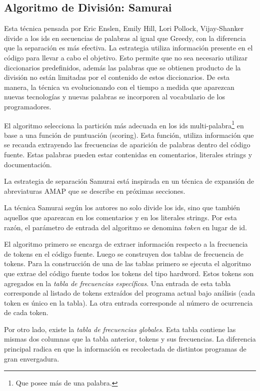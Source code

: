\documentclass[a4paper,12pt]{report}
\begin{document}
\subsection{Algoritmo de División: Samurai}
\label{sec:algSamu}

Esta técnica pensada por Eric Enslen, Emily Hill, Lori Pollock, Vijay-Shanker \cite{EHPV09} divide a los ids en secuencias de palabras al igual que Greedy, con la diferencia que la separación es más efectiva. La estrategia utiliza información presente en el código para llevar a cabo el objetivo. Esto permite que no sea necesario utilizar diccionarios predefinidos, además las palabras que se obtienen producto de la división no están limitadas por el contenido de estos diccionarios. De esta manera, la técnica va evolucionando con el tiempo a medida que aparezcan nuevas tecnologías y nuevas palabras se incorporen al vocabulario de los programadores.

El algoritmo selecciona la partición más adecuada en los ids multi-palabra\footnote[1]{Que posee más de una palabra.} en base a una función de puntuación (scoring). Esta función, utiliza información que se recauda extrayendo las frecuencias de aparición de palabras dentro del código fuente. Estas palabras pueden estar contenidas en comentarios, literales strings y documentación.

La estrategia de separación Samurai está inspirada en un técnica de expansión de abreviaturas AMAP \cite{EZH08} que se describe en próximas secciones.

La técnica Samurai según los autores \cite{EHPV09} no solo divide los ids, sino que también aquellos que aparezcan en los comentarios y en los literales strings. 
Por esta razón, el parámetro de entrada del algoritmo se denomina \textit{token} en lugar de id.

El algoritmo primero se encarga de extraer información respecto a la frecuencia de tokens en el código fuente. Luego se construyen dos tablas de frecuencia de tokens. Para la construcción de una de las tablas primero se ejecuta el algoritmo que extrae del código fuente todos los tokens del tipo hardword. Estos tokens son agregados en la \textit{tabla de frecuencias específicas}. Una entrada de esta tabla corresponde al listado de tokens extraídos del programa actual bajo análisis (cada token es único en la tabla). La otra entrada corresponde al número de ocurrencia de cada token. 

Por otro lado, existe la \textit{tabla de frecuencias globales}. Esta tabla contiene las mismas dos columnas que la tabla anterior, tokens y sus frecuencias. La diferencia principal radica en que la información es recolectada de distintos programas de gran envergadura. 
\end{document}
